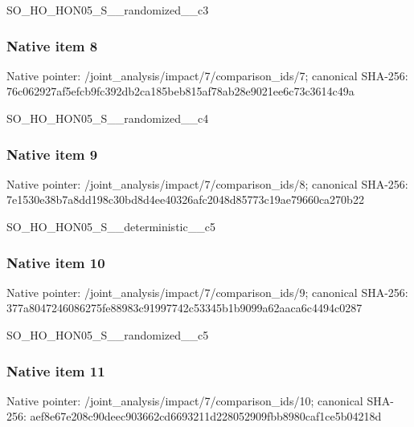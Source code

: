 \documentclass[10pt,a4paper]{article}
\begin{document}
\begingroup\raggedright\sloppy SO\_\allowbreak{}HO\_\allowbreak{}HON05\_\allowbreak{}S\_\allowbreak{}\_\allowbreak{}randomized\_\allowbreak{}\_\allowbreak{}c3\par\endgroup

\subsubsection{Native item 8}
Native pointer: /joint\_\allowbreak{}analysis/impact/7/comparison\_\allowbreak{}ids/7; canonical SHA-256: 76c062927af5efcb9fc392db2ca185beb815af78ab28e9021ee6c73c3614c49a

\begingroup\raggedright\sloppy SO\_\allowbreak{}HO\_\allowbreak{}HON05\_\allowbreak{}S\_\allowbreak{}\_\allowbreak{}randomized\_\allowbreak{}\_\allowbreak{}c4\par\endgroup

\subsubsection{Native item 9}
Native pointer: /joint\_\allowbreak{}analysis/impact/7/comparison\_\allowbreak{}ids/8; canonical SHA-256: 7e1530e38b7a8dd198c30bd8d4ee40326afc2048d85773c19ae79660ca270b22

\begingroup\raggedright\sloppy SO\_\allowbreak{}HO\_\allowbreak{}HON05\_\allowbreak{}S\_\allowbreak{}\_\allowbreak{}deterministic\_\allowbreak{}\_\allowbreak{}c5\par\endgroup

\subsubsection{Native item 10}
Native pointer: /joint\_\allowbreak{}analysis/impact/7/comparison\_\allowbreak{}ids/9; canonical SHA-256: 377a8047246086275fe88983c91997742c53345b1b9099a62aaca6c4494c0287

\begingroup\raggedright\sloppy SO\_\allowbreak{}HO\_\allowbreak{}HON05\_\allowbreak{}S\_\allowbreak{}\_\allowbreak{}randomized\_\allowbreak{}\_\allowbreak{}c5\par\endgroup

\subsubsection{Native item 11}
Native pointer: /joint\_\allowbreak{}analysis/impact/7/comparison\_\allowbreak{}ids/10; canonical SHA-256: aef8e67e208c90deec903662cd6693211d228052909fbb8980caf1ce5b04218d
\end{document}
